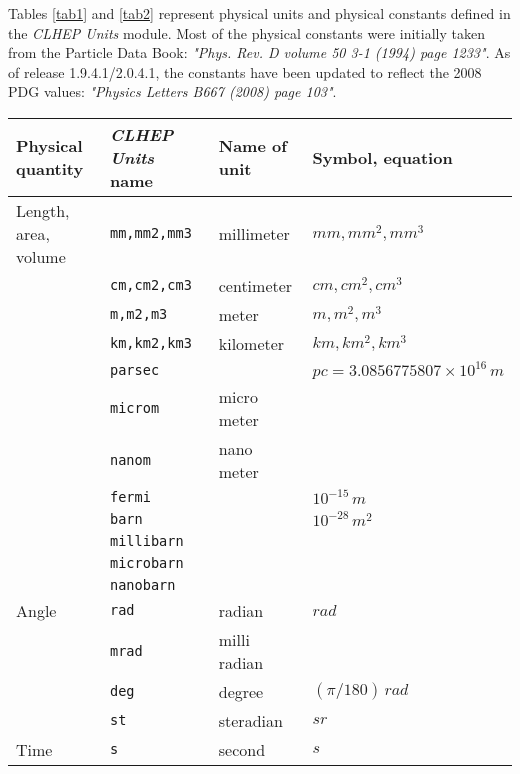 \documentclass{article}
\begin{document}
Tables \ref{tab1} and \ref{tab2} represent physical units and
physical constants defined in the {\it CLHEP Units} module.
Most of the physical constants were initially taken from
the Particle Data Book: {\it "Phys. Rev. D volume 50 3-1 (1994) page 1233"}.
As of release 1.9.4.1/2.0.4.1, the constants have been updated to reflect 
the 2008 PDG values: {\it "Physics Letters B667 (2008) page 103"}.

\begin{table}
\centering
\begin{tabular}{|l|l|l|l|}
\hline
\bf{Physical quantity}&
\bf{{\it CLHEP Units} name}&
\bf{Name of unit}&\bf{Symbol, equation}\\
\hline
Length, area, volume&{\tt mm,mm2,mm3}    & millimeter   &$ mm,mm^2,mm^3  $\\
                   &{\tt cm,cm2,cm3}    & centimeter   &$ cm,cm^2,cm^3   $\\
                   &{\tt m,m2,m3}       & meter        &$ m,m^2,m^3      $\\ 
                   &{\tt km,km2,km3}    & kilometer    &$ km,km^2,km^3   $\\
                   &{\tt parsec}        & &$pc=3.0856775807\times 10^{16}\,m$\\
                   &{\tt microm}        & micro meter  &$                $\\
                   &{\tt nanom}         & nano meter   &$                $\\
                   &{\tt fermi}         &              &$ 10^{-15}\,m    $\\
                   &{\tt barn}          &              &$ 10^{-28}\,m^2  $\\ 
                   &{\tt millibarn}     &              &$                $\\
                   &{\tt microbarn}     &              &$                $\\
                   &{\tt nanobarn}      &              &$                $\\
Angle              &{\tt rad}           & radian       &$ rad            $\\
                   &{\tt mrad}          & milli radian &$                $\\
                   &{\tt deg}           & degree       &$ (\pi/180)\,rad $\\
                   &{\tt st}            & steradian    &$ sr             $\\
Time               &{\tt s}             & second       &$ s              $\\

\end{tabular}
\end{table}
\end{document}
